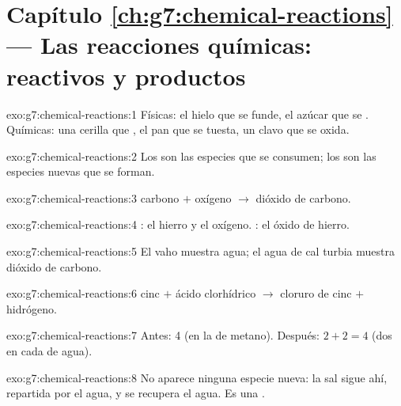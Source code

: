 \section*{Capítulo \ref{ch:g7:chemical-reactions} --- Las reacciones químicas: reactivos y productos}

\begin{solution}{exo:g7:chemical-reactions:1}
Físicas: el hielo que se funde, el azúcar que se . Químicas:
una cerilla que , el pan que se tuesta, un clavo que se oxida.
\end{solution}

\begin{solution}{exo:g7:chemical-reactions:2}
Los  son las especies que se consumen; los  son las
especies nuevas que se forman.
\end{solution}

\begin{solution}{exo:g7:chemical-reactions:3}
carbono $+$ oxígeno $\longrightarrow$ dióxido de carbono.
\end{solution}

\begin{solution}{exo:g7:chemical-reactions:4}
: el hierro y el oxígeno. : el óxido de hierro.
\end{solution}

\begin{solution}{exo:g7:chemical-reactions:5}
El vaho muestra agua; el agua de cal turbia muestra dióxido de carbono.
\end{solution}

\begin{solution}{exo:g7:chemical-reactions:6}
cinc $+$ ácido clorhídrico $\longrightarrow$ cloruro de cinc $+$ hidrógeno.
\end{solution}

\begin{solution}{exo:g7:chemical-reactions:7}
Antes: 4 (en la  de metano). Después: $2 + 2 = 4$ (dos en cada
 de agua).
\end{solution}

\begin{solution}{exo:g7:chemical-reactions:8}
No aparece ninguna especie nueva: la sal sigue ahí, repartida por el
agua, y se recupera  el agua. Es una .
\end{solution}

